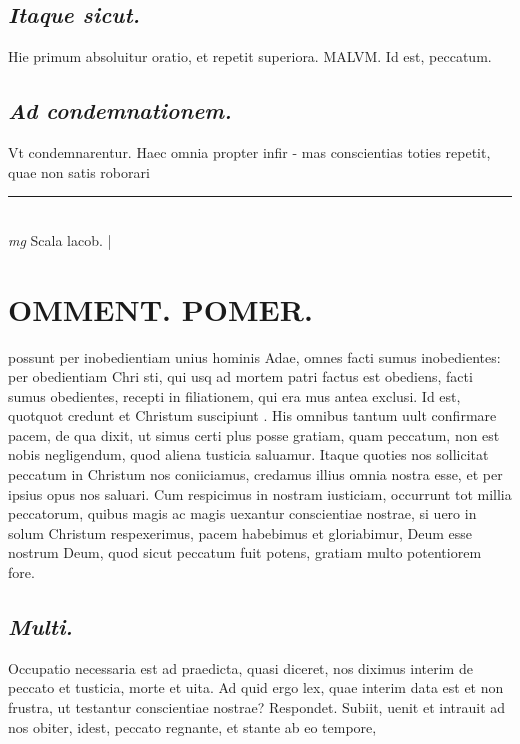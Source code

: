 \documentclass{article}
\begin{document}
\begin{pages}
\subsection*{\textit{Itaque sicut. }}\pstart Hie primum absoluitur oratio, et repetit superiora. MALVM. Id est, peccatum.   \pend
{}
{}
\subsection*{\textit{Ad condemnationem. }}\pstart Vt condemnarentur. Haec omnia propter infir - mas conscientias toties repetit, quae non satis roborari  \pend
\vspace{0.5cm}\noindent
\vspace{0.2cm}\rule{1cm}{0.2pt}\\ 
\hspace{0.2cm}\textit{mg}
\footnotesize Scala lacob.  
\normalsize| 
\section*{OMMENT. POMER.  }\pstart possunt per inobedientiam unius hominis Adae, omnes facti sumus inobedientes: per obedientiam Chri sti, qui usq ad mortem patri factus est obediens, facti sumus obedientes, recepti in filiationem, qui era mus antea exclusi.  \pend\pstart Id est, quotquot credunt et Christum suscipiunt .  His omnibus tantum uult confirmare pacem, de qua dixit, ut simus certi plus posse gratiam, quam peccatum, non est nobis negligendum, quod aliena tusticia saluamur. Itaque quoties nos sollicitat peccatum in Christum nos coniiciamus, credamus illius omnia nostra esse, et per ipsius opus nos saluari. Cum respicimus in nostram iusticiam, occurrunt tot millia peccatorum, quibus magis ac magis uexantur conscientiae nostrae, si uero in solum Christum respexerimus, pacem habebimus et gloriabimur, Deum esse nostrum Deum, quod sicut peccatum fuit potens, gratiam multo potentiorem fore.   \pend
{}
{}
\subsection*{\textit{Multi. }}\pstart Occupatio necessaria est ad praedicta, quasi diceret, nos diximus interim de peccato et tusticia, morte et uita. Ad quid ergo lex, quae interim data est et non frustra, ut testantur conscientiae nostrae? Respondet. Subiit, uenit et intrauit ad nos obiter, idest, peccato regnante, et stante ab eo tempore,  \pend
{}
{}

\end{pages}
\end{document}

